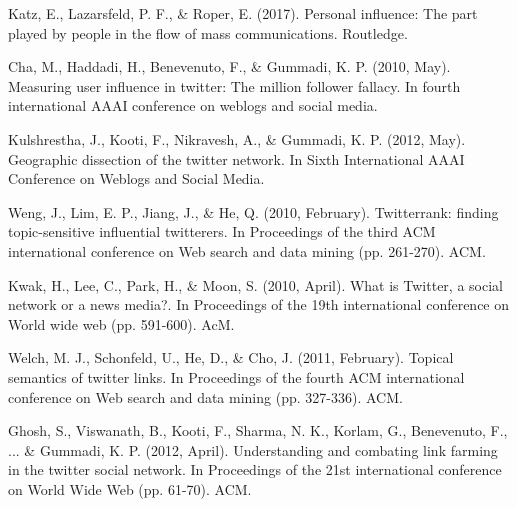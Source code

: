 \documentclass[conference]{IEEEtran}
\theoremstyle{definition}
\begin{document}
%
%

\begin{thebibliography}{00}
 Katz, E., Lazarsfeld, P. F., \& Roper, E. (2017). Personal influence: The part played by people in the flow of mass communications. Routledge.

 Cha, M., Haddadi, H., Benevenuto, F., \& Gummadi, K. P. (2010, May). Measuring user influence in twitter: The million follower fallacy. In fourth international AAAI conference on weblogs and social media.

 Kulshrestha, J., Kooti, F., Nikravesh, A., \& Gummadi, K. P. (2012, May). Geographic dissection of the twitter network. In Sixth International AAAI Conference on Weblogs and Social Media. 

 Weng, J., Lim, E. P., Jiang, J., \& He, Q. (2010, February). Twitterrank: finding topic-sensitive influential twitterers. In Proceedings of the third ACM international conference on Web search and data mining (pp. 261-270). ACM.

 Kwak, H., Lee, C., Park, H., \& Moon, S. (2010, April). What is Twitter, a social network or a news media?. In Proceedings of the 19th international conference on World wide web (pp. 591-600). AcM.

 Welch, M. J., Schonfeld, U., He, D., \& Cho, J. (2011, February). Topical semantics of twitter links. In Proceedings of the fourth ACM international conference on Web search and data mining (pp. 327-336). ACM.


 Ghosh, S., Viswanath, B., Kooti, F., Sharma, N. K., Korlam, G., Benevenuto, F., ... \& Gummadi, K. P. (2012, April). Understanding and combating link farming in the twitter social network. In Proceedings of the 21st international conference on World Wide Web (pp. 61-70). ACM.
\end{thebibliography}
\end{document}
